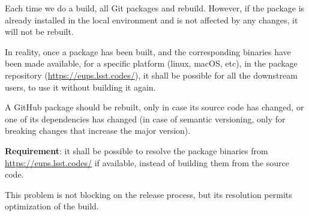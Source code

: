 Each time we do a build, all Git packages and rebuild. However, if the package is already installed in the local environment and is not affected by any changes, it will not be rebuilt.

In reality, once a package has been built, and the corresponding binaries have been made available, for a specific platform (linux, macOS, etc), in the package repository (\url{https://eups.lsst.codes/}),
it shall be possible for all the downstream users, to use it without building it again.

A GitHub package should be rebuilt, only in case its source code has changed, or one of its dependencies has changed (in case of semantic versioning, only for breaking changes that increase the major version).

\textbf{Requirement}: it shall be possible to resolve the package binaries from \url{https://eups.lsst.codes/} if available, instead of building them from the source code.

This problem is not blocking on the release process, but its resolution permits optimization of the build.


